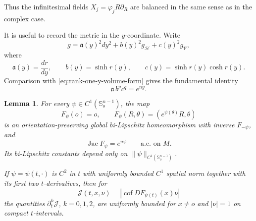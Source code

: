 \documentclass[11pt,reqno]{amsart}
\numberwithin{equation}{section}
\newtheorem{lemma}[theorem]{Lemma}
\theoremstyle{definition}
\theoremstyle{remark}
\newcommand{\Jac}{\operatorname{Jac}}
\newcommand{\cof}{\operatorname{cof}}
\begin{document}
Thus the infinitesimal fields $X_j=\varphi_jR\partial_R$ are balanced in the
same sense as in the complex case.

It is useful to record the metric in the $y$-coordinate.  Write
\[
g
=
\mathfrak a(y)^2dy^2
+b(y)^2g_{\mathcal H}
+c(y)^2g_{\mathcal V},
\]
where
\[
\mathfrak a(y)=\frac{dr}{dy},
\qquad
b(y)=\sinh r(y),
\qquad
c(y)=\sinh r(y)\cosh r(y).
\]
Comparison with \eqref{eq:rank-one-y-volume-form} gives the fundamental
identity
\begin{equation}
\mathfrak a\,b^pc^q=e^{ny}.
\label{eq:rank-one-abc-volume-identity}
\end{equation}

\begin{lemma}
\label{lem:rank-one-global-stretches}
For every $\psi\in C^1(\mathbb S_o^{n-1})$, the map
\[
F_\psi(o)=o,
\qquad
F_\psi(R,\theta)=(e^{\psi(\theta)}R,\theta)
\]
is an orientation-preserving global bi-Lipschitz homeomorphism with inverse
$F_{-\psi}$, and
\[
\Jac F_\psi=e^{n\psi}
\qquad\text{a.e. on }M.
\]
Its bi-Lipschitz constants depend only on
$\|\psi\|_{C^1(\mathbb S_o^{n-1})}$.

If $\psi=\psi(t,\cdot)$ is $C^2$ in $t$ with uniformly bounded $C^1$
spatial norm together with its first two $t$-derivatives, then for
\[
\mathcal J(t,x,\nu)
=
|\cof DF_{\psi(t)}(x)\nu|
\]
the quantities $\partial_t^k\mathcal J$, $k=0,1,2$, are uniformly bounded for
$x\ne o$ and $|\nu|=1$ on compact $t$-intervals.
\end{lemma}
\end{document}
